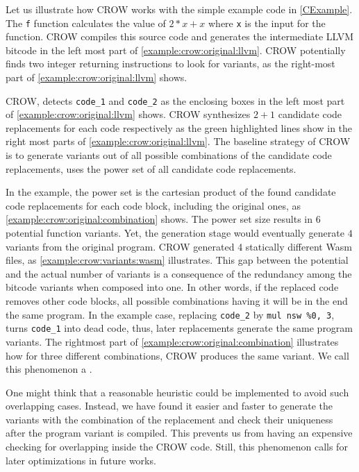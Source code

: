Let us illustrate how CROW works with the simple example code in \autoref{CExample}. The \texttt{f} function calculates the value of $2 * x + x$ where \texttt{x} is the input for the function.  CROW compiles this source code and generates the intermediate LLVM bitcode in the left most part of \autoref{example:crow:original:llvm}. CROW potentially finds two integer returning instructions to look for variants, as the right-most part of \autoref{example:crow:original:llvm} shows.


    

CROW, detects \texttt{code\_1} and \texttt{code\_2} as the enclosing boxes in the left most part of \autoref{example:crow:original:llvm} shows. CROW synthesizes $2 + 1$ candidate code replacements for each code respectively as the green highlighted lines show in the right most parts of \autoref{example:crow:original:llvm}.
The baseline strategy of CROW is to generate variants out of all possible combinations of the candidate code replacements, \ie uses the power set of all candidate code replacements.

In the example, the power set is the cartesian product of the found candidate code replacements for each code block, including the original ones, as \autoref{example:crow:original:combination} shows. The power set size results in $6$ potential function variants. Yet, the generation stage would eventually generate $4$ variants from the original program. CROW generated 4 statically different Wasm files, as \autoref{example:crow:variants:wasm} illustrates. This gap between the potential and the actual number of variants is a consequence of the redundancy among the bitcode variants when composed into one. In other words, if the replaced code removes other code blocks, all possible combinations having it will be in the end the same program. In the example case, replacing \texttt{code\_2} by \texttt{mul nsw \%0, 3}, turns \texttt{code\_1} into dead code, thus, later replacements generate the same program variants. The rightmost part of \autoref{example:crow:original:combination} illustrates how for three different combinations, CROW produces the same variant. We call this phenomenon a .



One might think that a reasonable heuristic could be implemented to avoid such overlapping cases. Instead, we have found it easier and faster to generate the variants with the combination of the replacement and check their uniqueness after the program variant is compiled. This prevents us from having an expensive checking for overlapping inside the CROW code. Still, this phenomenon calls for later optimizations in future works.

